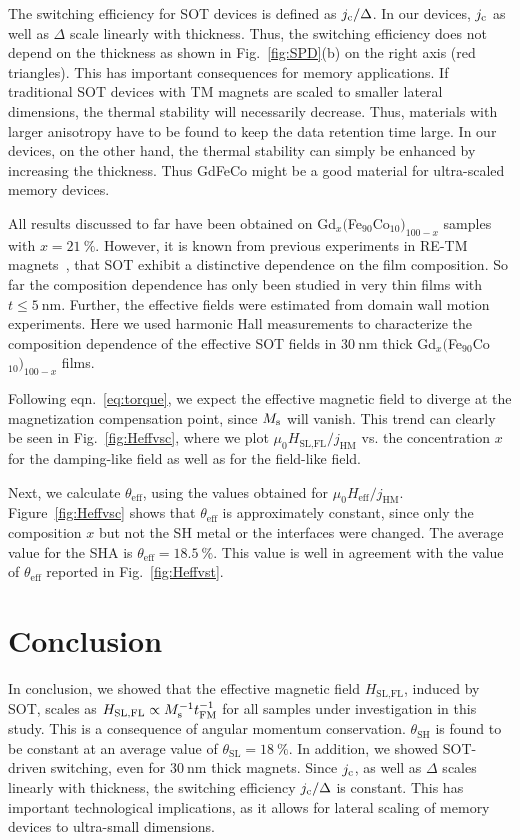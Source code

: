 \documentclass[aps,prb,superscriptaddress,sd,reprint]{revtex4-1}
\begin{document}
The switching efficiency for SOT devices is defined as $j_\text c/\Delta$. In our devices, $j_\text c$ as well as $\Delta$ scale linearly with thickness. Thus, the switching efficiency does not depend on the thickness as shown in Fig.~\ref{fig:SPD}(b) on the right axis (red triangles). This has important consequences for memory applications. If traditional SOT devices with TM magnets are scaled to smaller lateral dimensions, the thermal stability will necessarily decrease. Thus, materials with larger anisotropy have to be found to keep the data retention time large. In our devices, on the other hand, the thermal stability can simply be enhanced by increasing the thickness. Thus GdFeCo might be a good material for ultra-scaled memory devices.

All results discussed to far have been obtained on Gd$_x($Fe$_{90}$Co$_{10})_{100-x}$ samples with $x=\SI{21}{\percent}$. However, it is known from previous experiments in RE-TM magnets~\cite{Ueda2016,Roschewsky2016,Finley2016}, that SOT exhibit a distinctive dependence on the film composition. So far the composition dependence has only been studied in very thin films with $t\le\SI{5}{\nano\meter}$. Further, the effective fields were estimated from domain wall motion experiments. Here we used harmonic Hall measurements to characterize the composition dependence of the effective SOT fields in $\SI{30}{\nano\meter}$ thick Gd$_x($Fe$_{90}$Co$_{10})_{100-x}$ films. 

Following eqn.~\eqref{eq:torque}, we expect the effective magnetic field to diverge at the magnetization compensation point, since $M_\text s$ will vanish. This trend can clearly be seen in Fig.~\ref{fig:Heffvsc}, where we plot $\mu_0 H_\text{SL,FL}/j_\text{HM}$ vs. the concentration $x$ for the damping-like field as well as for the field-like field.

Next, we calculate $\theta_\text{eff}$, using the values obtained for $\mu_0 H_\text{eff}/j_\text{HM}$. Figure~\ref{fig:Heffvsc} shows that $\theta_\text{eff}$ is approximately constant, since only the composition $x$ but not the SH metal or the interfaces were changed. The average value for the SHA is $\theta_\text{eff}=\SI{18.5}{\percent}$. This value is well in agreement with the value of $\theta_\text{eff}$ reported in Fig.~\ref{fig:Heffvst}.

\section{Conclusion}
In conclusion, we showed that the effective magnetic field $H_\text{SL,FL}$, induced by SOT, scales as $H_\text{SL,FL}\propto M^{-1}_\text s t^{-1}_\text{FM}$ for all samples under investigation in this study. This is a consequence of angular momentum conservation. $\theta_\text{SH}$ is found to be constant at an average value of $\theta_\text{SL}=\SI{18}{\percent}$. In addition, we showed SOT-driven switching, even for $\SI{30}{\nano\meter}$ thick magnets. Since $j_\text c$, as well as $\Delta$ scales linearly with thickness, the switching efficiency $j_\text c/\Delta$ is constant. This has important technological implications, as it allows for lateral scaling of memory devices to ultra-small dimensions.
\end{document}
